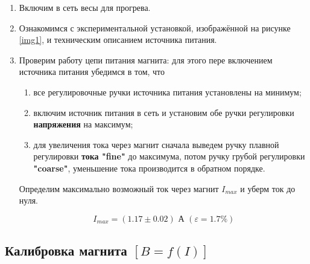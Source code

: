 \documentclass[a4paper,12pt]{article} %
\begin{document}
\begin{enumerate}
    \item Включим в сеть весы для прогрева.
    \item Ознакомимся с экспериментальной установкой, изображённой на рисунке \ref{img1}, и техническим описанием источника питания.
    \item Проверим работу цепи питания магнита: для этого пере включением источника питания убедимся в том, что
    \begin{enumerate}
        \item все регулировочные ручки источника питания установлены на минимум;
        \item включим источник питания в сеть и установим обе ручки регулировки \textbf{напряжения} на максимум;
        \item для увеличения тока через магнит сначала выведем ручку плавной регулировки \textbf{тока "fine"} до максимума, потом ручку грубой регулировки \textbf{"coarse"}, уменьшение тока производится в обратном порядке. 
    \end{enumerate}
    Определим максимально возможный ток через магнит $I_{max}$ и уберм ток до нуля.

    \[ I_{max} = (1.17 \pm 0.02) \text{ А } (\varepsilon = 1.7\%) \]
    
\end{enumerate}

\subsection{Калибровка магнита $[B = f(I)]$}
\end{document}
